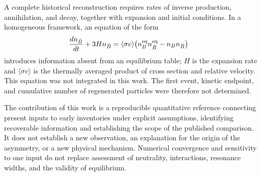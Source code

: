 A complete historical reconstruction requires rates of inverse production, annihilation, and decay, together with expansion and initial conditions. In a homogeneous framework, an equation of the form
\begin{align}
\frac{dn_{\bar B}}{dt}+3Hn_{\bar B}
&=\langle\sigma v\rangle\bigl(n_B^{\rm eq}n_{\bar B}^{\rm eq}
-n_Bn_{\bar B}\bigr)\label{eq:kinetic}
\end{align}
introduces information absent from an equilibrium table; $H$ is the expansion rate and $\langle\sigma v\rangle$ is the thermally averaged product of cross section and relative velocity. This equation was not integrated in this work. The first event, kinetic endpoint, and cumulative number of regenerated particles were therefore not determined.

The contribution of this work is a reproducible quantitative reference connecting present inputs to early inventories under explicit assumptions, identifying recoverable information and establishing the scope of the published comparison. It does not establish a new observation, an explanation for the origin of the asymmetry, or a new physical mechanism. Numerical convergence and sensitivity to one input do not replace assessment of neutrality, interactions, resonance widths, and the validity of equilibrium.
